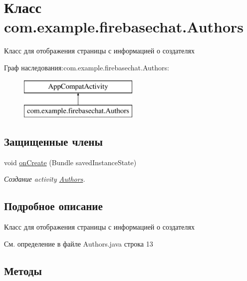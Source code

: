 \hypertarget{classcom_1_1example_1_1firebasechat_1_1_authors}{}\section{Класс com.\+example.\+firebasechat.\+Authors}
\label{classcom_1_1example_1_1firebasechat_1_1_authors}


Класс для отображения страницы с информацией о создателях  


Граф наследования\+:com.\+example.\+firebasechat.\+Authors\+:\begin{figure}[H]
\begin{center}
\leavevmode
\includegraphics[height=2.000000cm]{classcom_1_1example_1_1firebasechat_1_1_authors}
\end{center}
\end{figure}
\subsection*{Защищенные члены}
\begin{DoxyCompactItemize}
\item 
void \mbox{\hyperlink{classcom_1_1example_1_1firebasechat_1_1_authors_a9482fe36b1cabddda1532d2c5633daa3}{on\+Create}} (Bundle saved\+Instance\+State)
\begin{DoxyCompactList}\small\item\em Создание activity \mbox{\hyperlink{classcom_1_1example_1_1firebasechat_1_1_authors}{Authors}}. \end{DoxyCompactList}\end{DoxyCompactItemize}


\subsection{Подробное описание}
Класс для отображения страницы с информацией о создателях 

См. определение в файле Authors.\+java строка 13



\subsection{Методы}
\mbox{\label{classcom_1_1example_1_1firebasechat_1_1_authors_a9482fe36b1cabddda1532d2c5633daa3}} 
